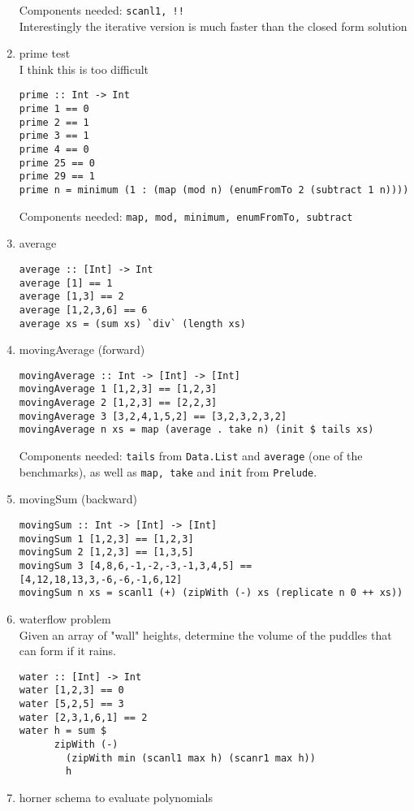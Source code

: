 \begin{enumerate}
	Components needed: \lstinline?scanl1, !!? \\
	Interestingly the iterative version is much faster than the closed form solution
%
	\item prime test \\
	I think this is too difficult
	\begin{lstlisting}
prime :: Int -> Int
prime 1 == 0
prime 2 == 1
prime 3 == 1
prime 4 == 0
prime 25 == 0
prime 29 == 1
prime n = minimum (1 : (map (mod n) (enumFromTo 2 (subtract 1 n))))
	\end{lstlisting}
	Components needed: \lstinline?map, mod, minimum, enumFromTo, subtract?
%
	\item average
	\begin{lstlisting}
average :: [Int] -> Int
average [1] == 1
average [1,3] == 2
average [1,2,3,6] == 6
average xs = (sum xs) `div` (length xs)
	\end{lstlisting}
%
	\item movingAverage (forward)
	\begin{lstlisting}
movingAverage :: Int -> [Int] -> [Int]
movingAverage 1 [1,2,3] == [1,2,3]
movingAverage 2 [1,2,3] == [2,2,3]
movingAverage 3 [3,2,4,1,5,2] == [3,2,3,2,3,2]
movingAverage n xs = map (average . take n) (init $ tails xs)
	\end{lstlisting}
	Components needed: \lstinline?tails? from \lstinline?Data.List? and  \lstinline?average? (one of the benchmarks), as well as \lstinline?map, take? and \lstinline?init? from \lstinline?Prelude?.
%
	\item movingSum (backward)
	\begin{lstlisting}
movingSum :: Int -> [Int] -> [Int]
movingSum 1 [1,2,3] == [1,2,3]
movingSum 2 [1,2,3] == [1,3,5]
movingSum 3 [4,8,6,-1,-2,-3,-1,3,4,5] == [4,12,18,13,3,-6,-6,-1,6,12]
movingSum n xs = scanl1 (+) (zipWith (-) xs (replicate n 0 ++ xs))
	\end{lstlisting}
%
	\item waterflow problem \\
	Given an array of "wall" heights, determine the volume of the puddles that can form if it rains.
	\begin{lstlisting}
water :: [Int] -> Int
water [1,2,3] == 0
water [5,2,5] == 3
water [2,3,1,6,1] == 2
water h = sum $ 
      zipWith (-) 
        (zipWith min (scanl1 max h) (scanr1 max h))
        h
	\end{lstlisting}
%
	\item horner schema to evaluate polynomials
	\begin{lstlisting}

\end{lstlisting}
\end{enumerate}
